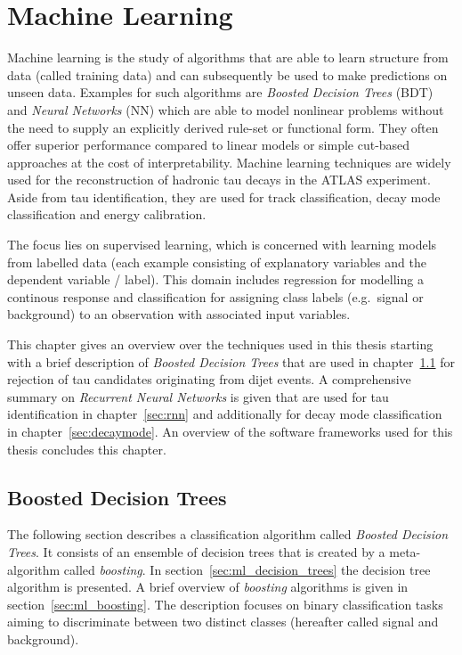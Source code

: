 \chapter{Machine Learning}
\label{sec:ml}

Machine learning is the study of algorithms that are able to learn structure
from data (called training data) and can subsequently be used to make
predictions on unseen data. Examples for such algorithms are \emph{Boosted
  Decision Trees} (BDT) and \emph{Neural Networks} (NN) which are able to model
nonlinear problems without the need to supply an explicitly derived rule-set or
functional form. They often offer superior performance compared to linear models
or simple cut-based approaches at the cost of interpretability. Machine learning
techniques are widely used for the reconstruction of hadronic tau decays in the
ATLAS experiment. Aside from tau identification, they are used for track
classification, decay mode classification and energy calibration.

The focus lies on  supervised learning,
which is concerned with learning models from labelled data (each example
consisting of explanatory variables and the dependent variable / label). This
domain includes regression for modelling a continous response and classification
for assigning class labels (e.g.\ signal or background) to an observation with
associated input variables.

This chapter gives an overview over the techniques used in this thesis starting
with a brief description of \emph{Boosted Decision Trees} that are used in
chapter~\ref{sec:bdt} for rejection of tau candidates originating from dijet
events. A comprehensive summary on \emph{Recurrent Neural Networks} is given
that are used for tau identification in chapter~\ref{sec:rnn} and additionally
for decay mode classification in chapter~\ref{sec:decaymode}. An overview of the
software frameworks used for this thesis concludes this chapter.

\section{Boosted Decision Trees}
\label{sec:bdt}

The following section describes a classification algorithm called \emph{Boosted
  Decision Trees}. It consists of an ensemble of decision trees that is created
by a meta-algorithm called \emph{boosting}. In
section~\ref{sec:ml_decision_trees} the decision tree algorithm is presented. A
brief overview of \emph{boosting} algorithms is given in
section~\ref{sec:ml_boosting}. The description focuses on binary classification
tasks aiming to discriminate between two distinct classes (hereafter called
signal and background).

